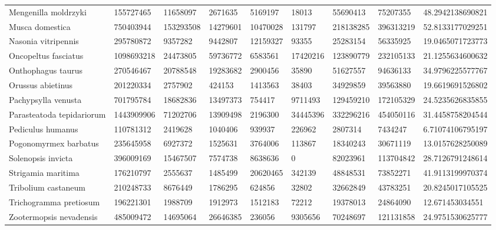\begin{table}[]
\begin{tabular}{@{}lllllllll@{}}
Mengenilla moldrzyki       & 155727465   & 11658097  & 2671635   & 5169197   & 18013     & 55690413   & 75207355   & 48.2942138690821  \\
Musca domestica            & 750403944   & 153293508 & 14279601  & 10470028  & 131797    & 218138285  & 396313219  & 52.8133177029251  \\
Nasonia vitripennis        & 295780872   & 9357282   & 9442807   & 12159327  & 93355     & 25283154   & 56335925   & 19.0465071723773  \\
Oncopeltus fasciatus       & 1098693218  & 24473805  & 59736772  & 6583561   & 17420216  & 123890779  & 232105133  & 21.1255634600632  \\
Onthophagus taurus         & 270546467   & 20788548  & 19283682  & 2900456   & 35890     & 51627557   & 94636133   & 34.9796225577767  \\
Orussus abietinus          & 201220334   & 2757902   & 424153    & 1413563   & 38403     & 34929859   & 39563880   & 19.6619691526802  \\
Pachypsylla venusta        & 701795784   & 18682836  & 13497373  & 754417    & 9711493   & 129459210  & 172105329  & 24.5235626835855  \\
Parasteatoda tepidariorum  & 1443909906  & 71202706  & 13909498  & 2196300   & 34445396  & 332296216  & 454050116  & 31.4458758204544  \\
Pediculus humanus          & 110781312   & 2419628   & 1040406   & 939937    & 226962    & 2807314    & 7434247    & 6.71074106795197  \\
Pogonomyrmex barbatus      & 235645958   & 6927372   & 1525631   & 3764006   & 113867    & 18340243   & 30671119   & 13.0157628250089  \\
Solenopsis invicta         & 396009169   & 15467507  & 7574738   & 8638636   & 0         & 82023961   & 113704842  & 28.7126791248614  \\
Strigamia maritima         & 176210797   & 2555637   & 1485499   & 20620465  & 342139    & 48848531   & 73852271   & 41.9113199970374  \\
Tribolium castaneum        & 210248733   & 8676449   & 1786295   & 624856    & 32802     & 32662849   & 43783251   & 20.8245017105525  \\
Trichogramma pretiosum     & 196221301   & 1988709   & 1912973   & 1512183   & 72212     & 19378013   & 24864090   & 12.671453034551   \\
Zootermopsis nevadensis    & 485009472   & 14695064  & 26646385  & 236056    & 9305656   & 70248697   & 121131858  & 24.9751530625777  \\ \bottomrule
\end{tabular}
\end{table}

